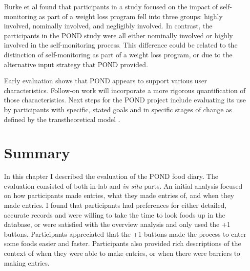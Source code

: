 Burke et al \citep{burke_experiences_2009} found that participants in a study focused on the impact of self-monitoring as part of a weight loss program fell into three groups: highly involved, nominally involved, and negligibly involved. In contrast, the participants in the POND study were all either nominally involved  or highly involved in the self-monitoring process. This difference could be related to the distinction of self-monitoring as part of a weight loss program, or due to the alternative input strategy that POND provided. 

Early evaluation shows that POND appears to support various user characteristics. Follow-on work will incorporate a more rigorous quantification of those characteristics. Next steps for the POND project include evaluating its use by participants with specific, stated goals and in specific stages of change as defined by the transtheoretical model \citep{prochaska_transtheoretical_1997}. 

\section{Summary}
In this chapter I described the evaluation of the POND food diary. The evaluation consisted of both in-lab and \textit{in situ} parts. An initial analysis focused on how participants made entries, what they made entries of, and when they made entries. I found that participants had preferences for either detailed, accurate records and were willing to take the time to look foods up in the database, or were satisfied with the overview analysis and only used the +1 buttons. Participants appreciated that the +1 buttons made the process to enter some foods easier and faster. Participants also provided rich descriptions of the context of when they were able to make entries, or when there were barriers to making entries. 

